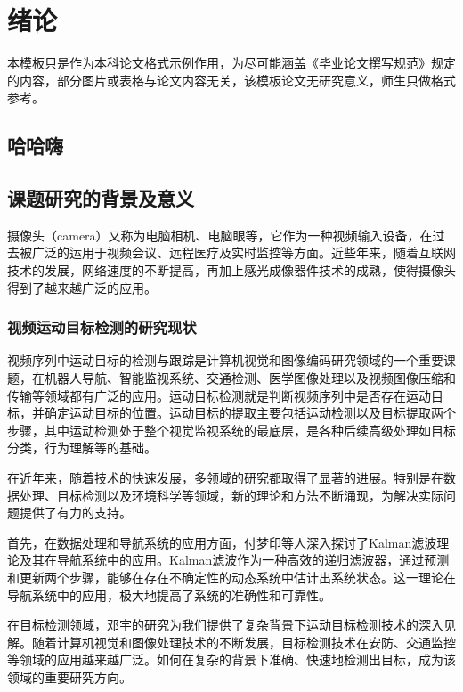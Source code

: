 
\section{绪论}

本模板只是作为本科论文格式示例作用，为尽可能涵盖《毕业论文撰写规范》规定的内容，部分图片或表格与论文内容无关，该模板论文无研究意义，师生只做格式参考。

\subsection{哈哈嗨}

\subsection{课题研究的背景及意义}

摄像头（camera）又称为电脑相机、电脑眼等，它作为一种视频输入设备，在过去被广泛的运用于视频会议、远程医疗及实时监控等方面。近些年来，随着互联网技术的发展，网络速度的不断提高，再加上感光成像器件技术的成熟，使得摄像头得到了越来越广泛的应用。

\subsubsection{视频运动目标检测的研究现状}

视频序列中运动目标的检测与跟踪是计算机视觉和图像编码研究领域的一个重要课题，在机器人导航、智能监视系统、交通检测、医学图像处理以及视频图像压缩和传输等领域都有广泛的应用。运动目标检测就是判断视频序列中是否存在运动目标，并确定运动目标的位置。运动目标的提取主要包括运动检测以及目标提取两个步骤，其中运动检测处于整个视觉监视系统的最底层，是各种后续高级处理如目标分类，行为理解等的基础。

在近年来，随着技术的快速发展，多领域的研究都取得了显著的进展。特别是在数据处理、目标检测以及环境科学等领域，新的理论和方法不断涌现，为解决实际问题提供了有力的支持。

首先，在数据处理和导航系统的应用方面，付梦印等人深入探讨了Kalman滤波理论及其在导航系统中的应用。Kalman滤波作为一种高效的递归滤波器，通过预测和更新两个步骤，能够在存在不确定性的动态系统中估计出系统状态。这一理论在导航系统中的应用，极大地提高了系统的准确性和可靠性。

在目标检测领域，邓宇的研究为我们提供了复杂背景下运动目标检测技术的深入见解。随着计算机视觉和图像处理技术的不断发展，目标检测技术在安防、交通监控等领域的应用越来越广泛。如何在复杂的背景下准确、快速地检测出目标，成为该领域的重要研究方向。

